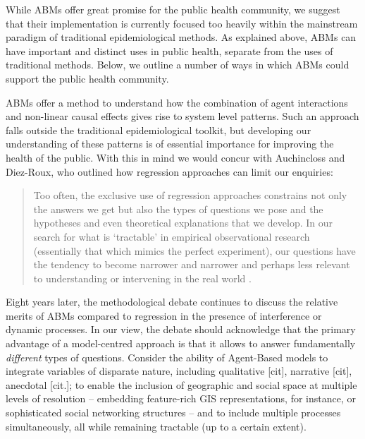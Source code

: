 \documentclass[review]{elsarticle}
\begin{document}
While ABMs offer great promise for the public health community, we suggest that their implementation is currently focused too heavily within the mainstream paradigm of traditional epidemiological methods. As explained above, ABMs can have important and distinct uses in public health, separate from the uses of traditional methods. Below, we outline a number of ways in which ABMs could support the public health community.

ABMs offer a method to understand how the combination of agent interactions and non-linear causal effects gives rise to system level patterns. Such an approach falls outside the traditional epidemiological toolkit, but developing our understanding of these patterns is of essential importance for improving the health of the public. With this in mind we would concur with Auchincloss and Diez-Roux, who outlined how regression approaches can limit our enquiries:

\begin{quote}
Too often, the exclusive use of regression approaches constrains not only the answers we get but also the types of questions we pose and the hypotheses and even theoretical explanations that we develop. In our search for what is `tractable' in empirical observational research (essentially that which mimics the perfect experiment), our questions have the tendency to become narrower and narrower and perhaps less relevant to understanding or intervening in the real world \citep[][p. 6]{auchincloss2008}.
\end{quote}

Eight years later, the methodological debate continues to discuss the relative merits of ABMs compared to regression in the presence of interference or dynamic processes. In our view, the debate should acknowledge that the primary advantage of a model-centred approach is that it allows to answer fundamentally \emph{different} types of questions. Consider the ability of Agent-Based models to integrate variables of disparate nature, including qualitative [cit], narrative [cit], anecdotal [cit.]; to enable the inclusion of geographic and social space at multiple levels of resolution -- embedding feature-rich GIS representations, for instance, or sophisticated social networking structures -- and to include multiple processes simultaneously, all while remaining tractable (up to a certain extent).

\end{document}
